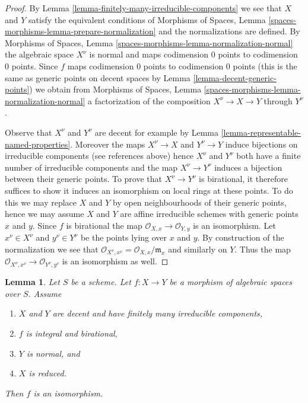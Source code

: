 \documentclass{stacks-project}
\theoremstyle{plain}
\newtheorem{lemma}[subsection]{Lemma}
\theoremstyle{definition}
\theoremstyle{remark}
\numberwithin{equation}{subsection}
\begin{document}
\begin{proof}
By Lemma \ref{lemma-finitely-many-irreducible-components} we see that
$X$ and $Y$ satisfy the equivalent conditions of
Morphisms of Spaces, Lemma \ref{spaces-morphisms-lemma-prepare-normalization}
and the normalizations are defined. By
Morphisms of Spaces, Lemma \ref{spaces-morphisms-lemma-normalization-normal}
the algebraic space $X^\nu$ is normal and maps codimension $0$ points
to codimension $0$ points. Since $f$ maps codimension $0$ points to
codimension $0$ points (this is the same as generic points on decent
spaces by Lemma \ref{lemma-decent-generic-points})
we obtain from
Morphisms of Spaces, Lemma \ref{spaces-morphisms-lemma-normalization-normal}
a factorization of the composition $X^\nu \to X \to Y$ through $Y^\nu$.

\medskip\noindent
Observe that $X^\nu$ and $Y^\nu$ are decent for example by
Lemma \ref{lemma-representable-named-properties}.
Moreover the maps $X^\nu \to X$ and $Y^\nu \to Y$
induce bijections on irreducible components (see references above)
hence $X^\nu$ and $Y^\nu$ both have a finite number of irreducible
components and the map $X^\nu \to Y^\nu$ induces a bijection
between their generic points.
To prove that $X^\nu \to Y^\nu$ is birational, it therefore
suffices to show it induces an isomorphism on local rings at
these points. To do this we may replace $X$ and $Y$ by open neighbourhoods
of their generic points, hence we may assume $X$ and $Y$ are affine
irreducible schemes with generic points $x$ and $y$. Since
$f$ is birational the map $\mathcal{O}_{X, x} \to \mathcal{O}_{Y, y}$
is an isomorphism. Let $x^\nu \in X^\nu$ and $y^\nu \in Y^\nu$ be
the points lying over $x$ and $y$.
By construction of the normalization
we see that $\mathcal{O}_{X^\nu, x^\nu} = \mathcal{O}_{X, x}/\mathfrak m_x$
and similarly on $Y$. Thus the map
$\mathcal{O}_{X^\nu, x^\nu} \to \mathcal{O}_{Y^\nu, y^\nu}$
is an isomorphism as well.
\end{proof}

\begin{lemma}
\label{lemma-finite-birational-over-normal}
Let $S$ be a scheme. Let $f : X \to Y$ be a morphism of algebraic
spaces over $S$. Assume
\begin{enumerate}
\item $X$ and $Y$ are decent and have finitely many irreducible components,
\item $f$ is integral and birational,
\item $Y$ is normal, and
\item $X$ is reduced.
\end{enumerate}
Then $f$ is an isomorphism.
\end{lemma}
\end{document}
